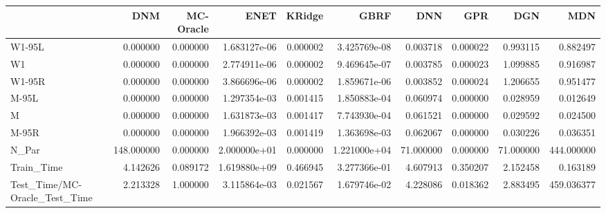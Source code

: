 \begin{tabular}{lrrrrrrrrr}
\toprule
{} &         DNM &  MC-Oracle &          ENET &    KRidge &          GBRF &        DNN &       GPR &        DGN &         MDN \\
\midrule
W1-95L                        &    0.000000 &   0.000000 &  1.683127e-06 &  0.000002 &  3.425769e-08 &   0.003718 &  0.000022 &   0.993115 &    0.882497 \\
W1                            &    0.000000 &   0.000000 &  2.774911e-06 &  0.000002 &  9.469645e-07 &   0.003785 &  0.000023 &   1.099885 &    0.916987 \\
W1-95R                        &    0.000000 &   0.000000 &  3.866696e-06 &  0.000002 &  1.859671e-06 &   0.003852 &  0.000024 &   1.206655 &    0.951477 \\
M-95L                         &    0.000000 &   0.000000 &  1.297354e-03 &  0.001415 &  1.850883e-04 &   0.060974 &  0.000000 &   0.028959 &    0.012649 \\
M                             &    0.000000 &   0.000000 &  1.631873e-03 &  0.001417 &  7.743930e-04 &   0.061521 &  0.000000 &   0.029592 &    0.024500 \\
M-95R                         &    0.000000 &   0.000000 &  1.966392e-03 &  0.001419 &  1.363698e-03 &   0.062067 &  0.000000 &   0.030226 &    0.036351 \\
N\_Par                         &  148.000000 &   0.000000 &  2.000000e+01 &  0.000000 &  1.221000e+04 &  71.000000 &  0.000000 &  71.000000 &  444.000000 \\
Train\_Time                    &    4.142626 &   0.089172 &  1.619880e+09 &  0.466945 &  3.277366e-01 &   4.607913 &  0.350207 &   2.152458 &    0.163189 \\
Test\_Time/MC-Oracle\_Test\_Time &    2.213328 &   1.000000 &  3.115864e-03 &  0.021567 &  1.679746e-02 &   4.228086 &  0.018362 &   2.883495 &  459.036377 \\
\bottomrule
\end{tabular}
